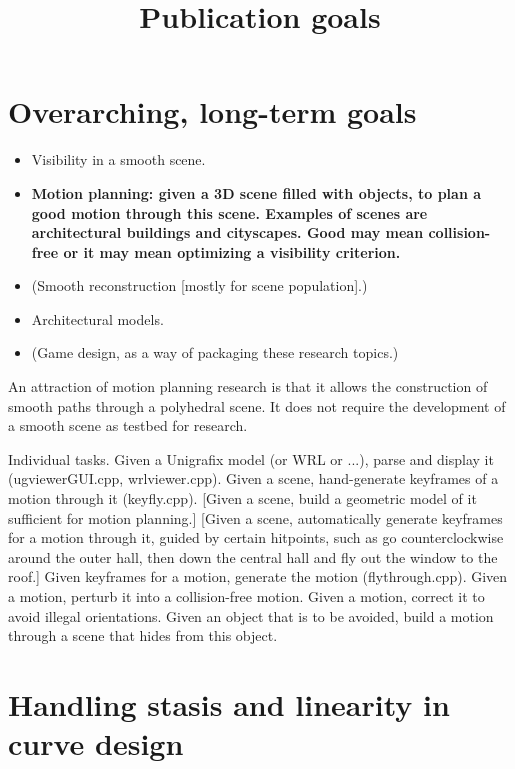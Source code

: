\documentclass[12pt]{article}
\title{Publication goals}
\begin{document}
\maketitle


\section{Overarching, long-term goals}

\begin{itemize}
\item Visibility in a smooth scene.
\item {\bf Motion planning: given a 3D scene filled with objects, to plan a good
           motion through this scene.  Examples of scenes are architectural buildings
           and cityscapes.  Good may mean collision-free or it may mean optimizing
           a visibility criterion.}
\item (Smooth reconstruction [mostly for scene population].)
\item Architectural models.
\item (Game design, as a way of packaging these research topics.)
\end{itemize}

An attraction of motion planning research is that it allows the construction
of smooth paths through a polyhedral scene.
It does not require the development of a smooth scene as testbed for research.

Individual tasks.
Given a Unigrafix model (or WRL or ...), parse and display it (ugviewerGUI.cpp, wrlviewer.cpp).
Given a scene, hand-generate keyframes of a motion through it (keyfly.cpp).
[Given a scene, build a geometric model of it sufficient for motion planning.]
[Given a scene, automatically generate keyframes for a motion through it, guided by 
    certain hitpoints, such as go counterclockwise around the outer hall, then down
    the central hall and fly out the window to the roof.]
Given keyframes for a motion, generate the motion (flythrough.cpp).
Given a motion, perturb it into a collision-free motion.
Given a motion, correct it to avoid illegal orientations.
Given an object that is to be avoided, build a motion through a scene that 
hides from this object.

\section{Handling stasis and linearity in curve design}
\end{document}
